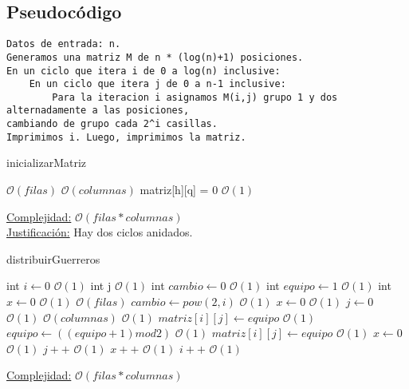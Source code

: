 \documentclass[10pt,a4paper]{article}
\begin{document}
\subsection{Pseudocódigo}
\begin{verbatim}
Datos de entrada: n.
Generamos una matriz M de n * (log(n)+1) posiciones.
En un ciclo que itera i de 0 a log(n) inclusive:
	En un ciclo que itera j de 0 a n-1 inclusive:
		Para la iteracion i asignamos M(i,j) grupo 1 y dos alternadamente a las posiciones,
cambiando de grupo cada 2^i casillas.
Imprimimos i. Luego, imprimimos la matriz.
\end{verbatim}



\begin{algorithm}
\caption{inicializarMatriz}
\begin{algorithmic}
	 \Comment $\mathcal{O}(filas)$
		 \Comment $\mathcal{O}(columnas)$
		\State matriz[h][q] = 0 \Comment $\mathcal{O}(1)$
		\EndFor
	\EndFor

\EndFunction
\end{algorithmic}
\underline{Complejidad:} $\mathcal{O}(filas*columnas)$\\
    \underline{Justificación:} Hay dos ciclos anidados.
\end{algorithm}


\begin{algorithm}
\caption{distribuirGuerreros}
\begin{algorithmic}
	\State int $i \gets 0$ \Comment $\mathcal{O}(1)$
	\State int j \Comment $\mathcal{O}(1)$
	\State int $cambio \gets 0$ \Comment $\mathcal{O}(1)$
	\State int $equipo \gets 1$ \Comment $\mathcal{O}(1)$
	\State int $x \gets 0$ \Comment $\mathcal{O}(1)$
	 \Comment $\mathcal{O}(filas)$
		\State $cambio \gets pow(2,i)$ \Comment $\mathcal{O}(1)$
		\State $x \gets 0$ \Comment $\mathcal{O}(1)$
		\State $j \gets 0$ \Comment $\mathcal{O}(1)$
		 \Comment $\mathcal{O}(columnas)$
			 \Comment $\mathcal{O}(1)$
				\State $matriz[i][j] \gets equipo$ \Comment $\mathcal{O}(1)$
			\Else
				\State $equipo \gets ((equipo +1) mod 2)$ \Comment $\mathcal{O}(1)$
				\State $matriz[i][j] \gets equipo$ \Comment $\mathcal{O}(1)$
				\State $x \gets 0$ \Comment $\mathcal{O}(1)$
			\EndIf
			\State $j++$ \Comment $\mathcal{O}(1)$
			\State $x++$ \Comment $\mathcal{O}(1)$
		\EndWhile
		\State $i++$ \Comment $\mathcal{O}(1)$
	\EndWhile
\EndFunction
\end{algorithmic}
\underline{Complejidad:} $\mathcal{O}(filas*columnas)$\\
\end{algorithm}
\end{document}
